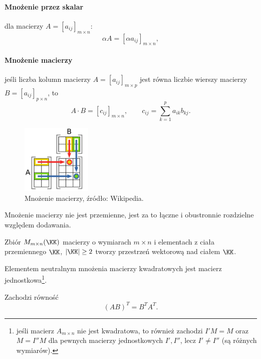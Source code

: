 \paragraph{Mnożenie przez skalar} dla macierzy $A = [a_{ij}]_{m \times n}$:
    \[ \alpha A = [\alpha a_{ij}]_{m \times n}, \]
\paragraph{Mnożenie macierzy} jeśli liczba kolumn macierzy $A = [a_{ij}]_{m \times p}$ jest równa liczbie wierszy macierzy $B = [a_{ij}]_{p \times n}$, to
    \[ A \cdot B = [c_{ij}]_{m \times n}, \qquad c_{ij} = \sum_{k=1}^p a_{ik}b_{kj}. \]

\begin{figure}[h]
    \centering
    \includegraphics[width=0.3\textwidth]{matrix_multiplication.pdf}
    \caption{Mnożenie macierzy, źródło: Wikipedia.}
\end{figure}

\begin{remark}
    Mnożenie macierzy nie jest przemienne, jest za to łączne i obustronnie rozdzielne względem dodawania.
\end{remark}

\begin{fact}
    Zbiór $M_{m \times n}(\KK)$ macierzy o wymiarach $m \times n$ i elementach z ciała przemiennego $\KK$, $|\KK| \geq 2$ tworzy przestrzeń wektorową nad ciałem $\KK$.
\end{fact}

\begin{fact}
    Elementem neutralnym mnożenia macierzy kwadratowych jest macierz jednostkowa\footnote{jeśli macierz $A_{m\times n}$ nie jest kwadratowa, to również zachodzi $I'M = M$ oraz $M = I''M$ dla pewnych macierzy jednostkowych $I', I''$, lecz $I' \neq I''$ (są różnych wymiarów).}.
\end{fact}

\begin{fact}
    Zachodzi równość
    \[ (AB)^T = B^T A^T. \]
\end{fact}
